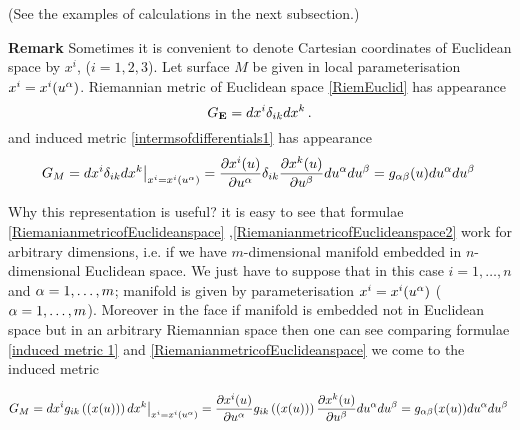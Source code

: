 \documentclass[12pt]{article}
\theoremstyle{theorem}
\numberwithin{equation}{section}
\begin{document}
(See the examples of calculations in the next subsection.)



{\bf Remark}  Sometimes it is convenient to denote Cartesian coordinates of Euclidean space
by $x^i$, ($i=1,2,3$).   Let surface $M$ be given in local  parameterisation $x^i=x^i(u^\alpha)$.
Riemannian metric of Euclidean space \eqref{RiemEuclid} has appearance
                  \begin{equation}\label{RiemanianmetricofEuclideanspace}
                   G_{\bf E}=dx^i\delta_{ik}dx^k\,.
                    \end{equation}
and induced metric \eqref{intermsofdifferentials1} has appearance
                  \begin{equation}\label{RiemanianmetricofEuclideanspace2}
                 G_M=dx^i\delta_{ik}dx^k\big\vert_{x^i=x^i(u^\alpha)}=
                 {\partial x^i(u)\over \partial u^\alpha}
                 \delta_{ik}
                 {\partial x^k(u)\over \partial u^\beta}
                 du^\alpha du^\beta=g_{\alpha\beta}(u)du^\alpha du^\beta\,
                    \end{equation}
{\footnotesize
Why this representation is useful? it is easy to see that formulae \eqref{RiemanianmetricofEuclideanspace}
,\eqref{RiemanianmetricofEuclideanspace2} work for arbitrary dimensions, i.e. if we have
$m$-dimensional manifold embedded in $n$-dimensional Euclidean space.
We just have to suppose that in this case $i=1,\dots, n$ and $\alpha=1,\dots,m$;
manifold is given by parameterisation $x^i=x^i(u^\alpha)$ ($\alpha=1,\dots,m$).
Moreover in the face if manifold is embedded not in Euclidean space but in an arbitrary
Riemannian space then one can see comparing formulae
\eqref{induced metric 1}  and \eqref{RiemanianmetricofEuclideanspace} we come to the induced metric

   \begin{equation*}\label{RiemanianmetricofEuclideanspace3}
                 G_M=dx^i g_{ik}\left(\left(x(u)\right)\right)dx^k\big\vert_{x^i=x^i(u^\alpha)}=
                 {\partial x^i(u)\over \partial u^\alpha}
                 g_{ik}\left(\left(x(u)\right)\right)
                 {\partial x^k(u)\over \partial u^\beta}
                 du^\alpha du^\beta=g_{\alpha\beta}(x(u))du^\alpha du^\beta\,
                    \end{equation*}



}
\end{document}
